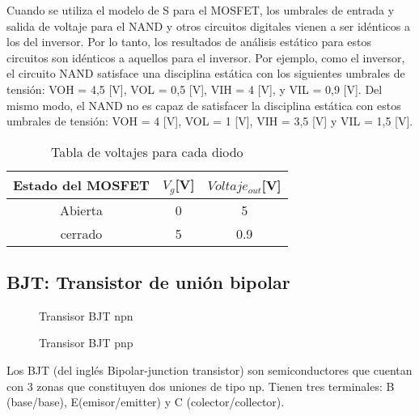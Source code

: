 \documentclass[11pt,fancy,lang=es]{elegantbook}
\begin{document}
    {Cuando se utiliza el modelo de S para el MOSFET, los umbrales de entrada
    y salida de voltaje para el NAND y otros circuitos digitales vienen a ser
    idénticos a los del inversor. Por lo tanto, los resultados de análisis
    estático para estos circuitos son idénticos a aquellos para
    el inversor. Por ejemplo, como el inversor, el circuito NAND satisface una
    disciplina estática con los siguientes umbrales de tensión:
    VOH = 4,5 [V], VOL = 0,5 [V], VIH = 4 [V], y VIL = 0,9 [V]. Del mismo modo, el NAND
    no es capaz de satisfacer la disciplina estática con estos umbrales
    de tensión: VOH = 4 [V], VOL = 1 [V], VIH = 3,5 [V] y VIL = 1,5 [V].}
    \begin{table}[ht]
        \begin{center}
            \caption{Tabla de voltajes para cada diodo}
            \label{table1}
            \begin{tabular}{ccc}
                \hline
                {Estado del MOSFET} & {$V_{g}$[V]} & {$Voltaje_{out}$[V]} \\
                \hline
                Abierta             & 0            & 5                    \\
                cerrado             & 5            & 0.9                  \\
                \hline
            \end{tabular}
        \end{center}
    \end{table}


\fi

\subsection{BJT: Transistor de unión bipolar}
\begin{figure}[!h]
    \centering
    \caption{Transisor BJT npn}
    \label{fig:BJTnpn}
\end{figure}

\begin{figure}[!h]
    \centering
    \caption{Transisor BJT pnp}
    \label{fig:BJTpnp}
\end{figure}
Los BJT (del inglés Bipolar-junction transistor) son semiconductores que cuentan con 3 zonas que constituyen dos uniones de tipo np. Tienen tres terminales: B (base/base), E(emisor/emitter) y C (colector/collector).
\end{document}
